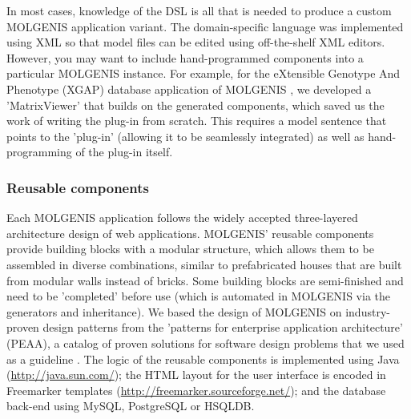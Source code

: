 In most cases, knowledge of the DSL is all that is needed to produce a custom MOLGENIS application 
variant. The domain-specific language was implemented using XML so that model files can be edited 
using off-the-shelf XML editors. However, you may want to include hand-programmed components into 
a particular MOLGENIS instance. For example, for the eXtensible Genotype And Phenotype (XGAP) 
database application of MOLGENIS \cite{Swertz:2010a}, we developed a 'MatrixViewer' that builds on the generated 
components, which saved us the work of writing the plug-in from scratch. This requires a model 
sentence that points to the 'plug-in' (allowing it to be seamlessly integrated) as well as 
hand-programming of the plug-in itself.

\subsubsection{Reusable components}
Each MOLGENIS application follows the widely accepted three-layered architecture design of web 
applications. MOLGENIS' reusable components provide building blocks with a modular structure, which 
allows them to be assembled in diverse combinations, similar to prefabricated houses that are built 
from modular walls instead of bricks. Some building blocks are semi-finished and need to be 
'completed' before use (which is automated in MOLGENIS via the generators and inheritance). We based 
the design of MOLGENIS on industry-proven design patterns from the 'patterns for enterprise 
application architecture' (PEAA), a catalog of proven solutions for software design problems 
that we used as a guideline \cite{Fowler:2002}. The logic of the reusable components is implemented using 
Java (\url{http://java.sun.com/}); the HTML layout for the user interface is encoded in Freemarker 
templates (\url{http://freemarker.sourceforge.net/}); and the database back-end using MySQL, PostgreSQL 
or HSQLDB.

